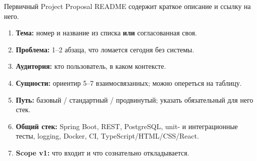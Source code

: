 \begin{frame}{Первичный Project Proposal}
  README содержит краткое описание и ссылку на него.

  \medskip
  \begin{enumerate}\setlength\itemsep{0.32em}
    \item \textbf{Тема:} номер и название из списка \textbf{или} согласованная своя.
    \item \textbf{Проблема:} 1--2 абзаца, что ломается сегодня без системы.
    \item \textbf{Аудитория:} кто пользователь, в каком контексте.
    \item \textbf{Сущности:} ориентир 5--7 взаимосвязанных; можно опереться на таблицу.
    \item \textbf{Путь:} базовый / стандартный / продвинутый;
          указать обязательный для него стек.
    \item \textbf{Общий стек:} Spring Boot, REST, PostgreSQL,
          unit- и интеграционные тесты, logging, Docker, CI,
          TypeScript/HTML/CSS/React.
    \item \textbf{Scope v1:} что входит и что сознательно откладывается.
  \end{enumerate}
\end{frame}

